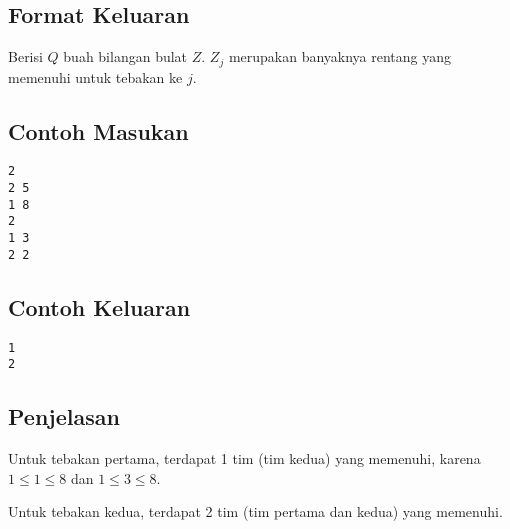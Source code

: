 \documentclass{article}
\begin{document}
\subsection*{Format Keluaran}
Berisi $Q$ buah bilangan bulat $Z$. $Z_j$ merupakan banyaknya rentang yang memenuhi untuk tebakan ke $j$.
\\

\begin{multicols}{2}
\subsection*{Contoh Masukan}
\begin{lstlisting}
2
2 5
1 8
2
1 3
2 2
\end{lstlisting}
\columnbreak
\subsection*{Contoh Keluaran}
\begin{lstlisting}
1
2
\end{lstlisting}
\vfill
\null
\end{multicols}

\subsection*{Penjelasan}
Untuk tebakan pertama, terdapat 1 tim (tim kedua) yang memenuhi, karena $1 \leq 1 \leq 8$ dan $1 \leq 3 \leq 8$.

Untuk tebakan kedua, terdapat 2 tim (tim pertama dan kedua) yang memenuhi.

\pagebreak
\end{document}
